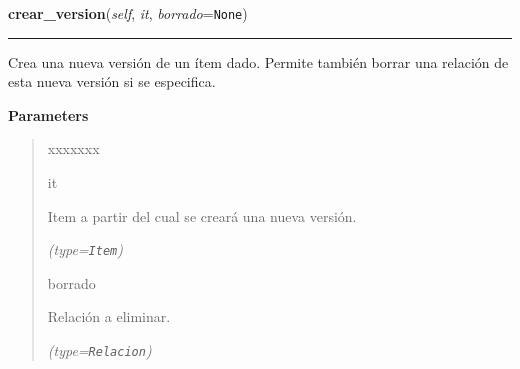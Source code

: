     \label{saip:controllers:version_controller:VersionController:crear_version}

    \vspace{0.5ex}

\hspace{.8\funcindent}\begin{boxedminipage}{\funcwidth}

    \raggedright \textbf{crear\_version}(\textit{self}, \textit{it}, \textit{borrado}={\tt None})

    \vspace{-1.5ex}

    \rule{\textwidth}{0.5\fboxrule}
\setlength{\parskip}{2ex}
    Crea una nueva versión de un ítem dado. Permite también borrar una 
    relación de esta nueva versión si se especifica.

\setlength{\parskip}{1ex}
      \textbf{Parameters}
      \vspace{-1ex}

      \begin{quote}
        \begin{Ventry}{xxxxxxx}

          \item[it]

          Item a partir del cual se creará una nueva versión.

            {\it (type=\texttt{Item})}

          \item[borrado]

          Relación a eliminar.

            {\it (type=\texttt{Relacion})}

        \end{Ventry}

      \end{quote}

    \end{boxedminipage}

    \label{saip:controllers:version_controller:VersionController:crear_relacion}

